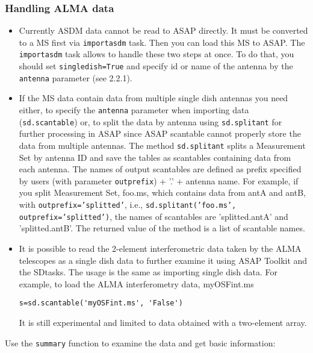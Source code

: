 \subsubsection{Handling ALMA data}

\begin{itemize}
\item Currently ASDM data cannot be read to ASAP directly. It must be converted
to a MS first via {\tt importasdm} task. Then you can load this MS to ASAP. The
 {\tt importasdm} task allows to handle these two steps at once. To do
 that, you should set {\tt singledish=True} and specify id or name of the
 antenna by the {\tt antenna} parameter (see 2.2.1). %

\item If the MS data contain data from multiple single dish antennas you need either, to 
specify the {\tt antenna} parameter when importing data ({\tt sd.scantable}) or,
 to split the data by antenna using {\tt sd.splitant} for further processing in ASAP 
since ASAP scantable cannot properly store the data from multiple antennas.
The method {\tt sd.splitant} splits a Measurement Set by antenna ID
and save the tables as scantables containing data from each antenna. 
The names of output scantables are defined as prefix specified by
users (with parameter {\tt outprefix}) + '.' + antenna name. For
example, if you split Measurement Set, foo.ms, which contains data
from antA and antB, with {\tt outprefix='splitted'}, i.e., 
{\tt sd.splitant('foo.ms', outprefix='splitted')}, the names of scantables
are 'splitted.antA' and 'splitted.antB'.  
The returned value of the method is a list of scantable names. 

\item It is possible to read the 2-element interferometric
data taken by the ALMA telescopes 
as a single dish data to further examine it using ASAP Toolkit and
the SDtasks. The usage is the same as importing single
dish data. 
For example, to load the ALMA interferometry data, myOSFint.ms
\begin{verbatim} 
s=sd.scantable('myOSFint.ms', 'False')
\end{verbatim} 
It is still experimental and limited to data obtained with a
two-element array.
\end{itemize}

Use the {\tt summary} function to examine the data and get basic information:

